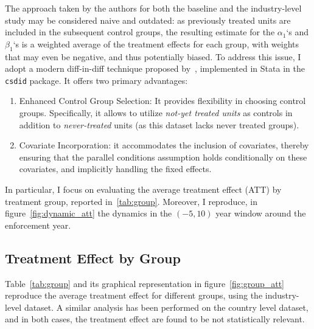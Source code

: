 The approach taken by the authors for both the baseline and the industry-level study may be considered naive and outdated: as previously treated units are included in the subsequent control groups, the resulting estimate for the $\alpha_1$`s and $\beta_1$`s is a weighted average of the treatment effects for each group, with weights that may even be negative, and thus potentially biased.
To address this issue, I adopt a modern diff-in-diff technique proposed by~\textcite{callaway}, implemented in Stata in the \texttt{csdid} package.
It offers two primary advantages:
\begin{enumerate}
\item Enhanced Control Group Selection: It provides flexibility in choosing control groups.
Specifically, it allows to utilize \textit{not-yet treated units} as controls in addition to \textit{never-treated} units (as this dataset lacks never treated groups).
\item Covariate Incorporation: it accommodates the inclusion of covariates, thereby ensuring that the parallel conditions assumption holds conditionally on these covariates, and implicitly handling the fixed effects.
\end{enumerate}
In particular, I focus on evaluating the average treatment effect (ATT) by treatment group, reported in~\ref{tab:group}.
Moreover, I reproduce, in figure~\ref{fig:dynamic_att} the dynamics in the $(-5,10)$ year window around the enforcement year.

\subsection{Treatment Effect by Group}\label{subsec:staggered-treatment-estimate}
Table~\ref{tab:group} and its graphical representation in figure~\ref{fig:group_att} reproduce the average treatment effect for different groups, using the industry-level dataset.
A similar analysis has been performed on the country level dataset, and in both cases, the treatment effect are found to be not statistically relevant.

